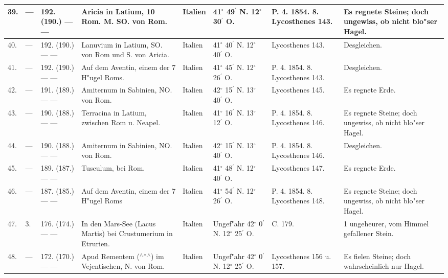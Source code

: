 \documentclass[a4paper, 8pt, oneside, polutonikogreek, german]{article}
\begin{document}
\begin{center}
\begin{longtable}{| p{5mm} | p{3mm} | p{15mm} | p{25mm} | p{20mm} | p{14mm} | p{17mm} | p{24mm} |}
        39. & --- & 192. (190.) --- --- & Aricia in Latium, 10 Rom. M. SO. von Rom. & Italien & 41$^\circ$ 49$^\prime$ N. 12$^\circ$ 30$^\prime$ O. & P. 4. 1854. 8. Lycosthenes 143. & Es regnete Steine; doch ungewiss, ob nicht blo"ser Hagel. \\ \hline
        40. & --- & 192. (190.) --- --- & Lanuvium in Latium, SO. von Rom und S. von Aricia. & Italien & 41$^\circ$ 40$^\prime$ N. 12$^\circ$ 40$^\prime$ O. & Lycosthenes 143. & Desgleichen. \\ \hline
        41. & --- & 192. (190.) --- --- & Auf dem Aventin, einem der 7 H"ugel Roms. & Italien & 41$^\circ$ 45$^\prime$ N. 12$^\circ$ 26$^\prime$ O. & P. 4. 1854. 8. Lycosthenes 143. & Desgleichen. \\ \hline
        42. & --- & 191. (189.) --- --- & Amiternum in Sabinien, NO. von Rom. & Italien & 42$^\circ$ 15$^\prime$ N. 13$^\circ$ 40$^\prime$ O. & Lycosthenes 145. & Es regnete Erde. \\ \hline
        43. & --- & 190. (188.) --- --- & Terracina in Latium, zwischen Rom u. Neapel. & Italien & 41$^\circ$ 16$^\prime$ N. 13$^\circ$ 12$^\prime$ O. & P. 4. 1854. 8. Lycosthenes 146. & Es regnete Steine; doch ungewiss, ob nicht blo"ser Hagel. \\ \hline
        44. & --- & 190. (188.) --- --- & Amiternum in Sabinien, NO. von Rom. & Italien & 42$^\circ$ 15$^\prime$ N. 13$^\circ$ 40$^\prime$ O. & P. 4. 1854. 8. Lycosthenes 146. & Desgleichen. \\ \hline
        45. & --- & 189. (187.) --- --- & Tusculum, bei Rom. & Italien & 41$^\circ$ 48$^\prime$ N. 12$^\circ$ 40$^\prime$ O. & Lycosthenes 147. & Es regnete Erde. \\ \hline
        46. & --- & 187. (185.) --- --- & Auf dem Aventin, einem der 7 H"ugel Roms & Italien & 41$^\circ$ 54$^\prime$ N. 12$^\circ$ 26$^\prime$ O. & P. 4. 1854. 8. Lycosthenes 148. & Es regnete Steine; doch ungewiss, ob nicht blo"ser Hagel. \\ \hline
        47. & 3. & 176. (174.) --- --- & In den Mars-See (Lacus Martis) bei Crustumerium in Etrurien. & Italien & Ungef"ahr 42$^\circ$ 0$^\prime$ N. 12$^\circ$ 25$^\prime$ O. & C. 179. & 1 ungeheurer, vom Himmel gefallener Stein. \\ \hline
        48. & --- & 172. (170.) --- --- & Apud Rementem ($^\wedge$$^\wedge$$^\wedge$) im Vejentischen, N. von Rom. & Italien & Ungef"ahr 42$^\circ$ 0$^\prime$ N. 12$^\circ$ 25$^\prime$ O. & Lycosthenes 156 u. 157. & Es fielen Steine; doch wahrscheinlich nur Hagel. \\ \hline

\end{longtable}
\end{center}
\end{document}
